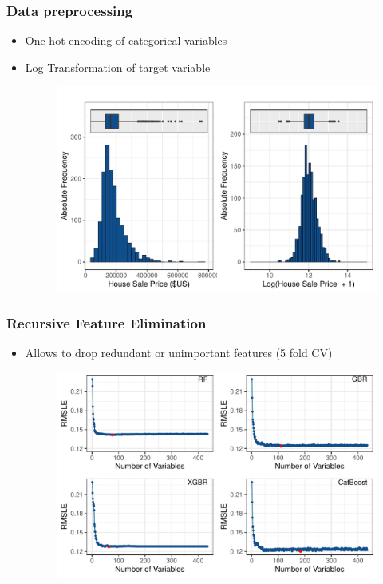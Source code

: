 \documentclass{beamer}
\begin{document}
\begin{frame}
	\frametitle{Data preprocessing}
	
	\begin{itemize}
		\item One hot encoding of categorical variables
		\item Log Transformation of target variable
		
		\begin{figure}[H]
			\begin{center}
				\includegraphics[width=0.8\linewidth]{2hist_saleprice.pdf}
			\end{center}
			\label{fig:log}
		\end{figure}
		
	\end{itemize}
	
\end{frame}


\begin{frame}
	\frametitle{Recursive Feature Elimination}
	
	\begin{itemize}
		\item Allows to drop redundant or unimportant features (5 fold CV)
		
		\begin{figure}[H]
			\begin{center}
				\includegraphics[width=0.8\linewidth]{RFE.pdf}
			\end{center}
			\label{fig:rfe}
		\end{figure}
		
	\end{itemize}
	
\end{frame}
\end{document}
